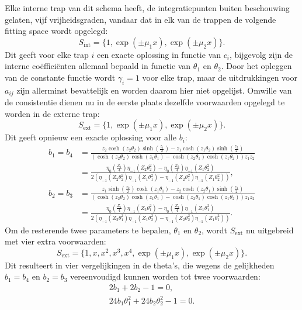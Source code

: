\documentclass[12pt]{article}
\begin{document}
Elke interne trap van dit schema heeft, de integratiepunten buiten beschouwing gelaten, vijf vrijheidsgraden, vandaar dat in elk van de trappen de volgende fitting space wordt opgelegd:
\[S_{\textrm{int}}=\{1,\exp(\pm\mu_1x),\exp(\pm\mu_2x)\}.\]
Dit geeft voor elke trap \(i\) een exacte oplossing in functie van \(c_i\), bijgevolg zijn de interne coëfficiënten allemaal bepaald in functie van \(\theta_1\) en \(\theta_2\). Door het opleggen van de constante functie wordt \(\gamma_i=1\) voor elke trap, maar de uitdrukkingen voor \(a_{ij}\) zijn allerminst bevattelijk en worden daarom hier niet opgelijst. Omwille van de consistentie dienen nu in de eerste plaats dezelfde voorwaarden opgelegd te worden in de externe trap:
\[S_{\textrm{ext}}=\{1,\exp(\pm\mu_1x),\exp(\pm\mu_2x)\}.\]
Dit geeft opnieuw een exacte oplossing voor alle \(b_i\):
\begin{equation*}
    \begin{split}
        b_1=b_4&=\frac{z_2\cosh(z_2\theta_2)\sinh(\frac{z_1}{2})-z_1\cosh(z_1\theta_2)\sinh(\frac{z_2}{2})}{(\cosh(z_2\theta_2)\cosh(z_1\theta_1)-\cosh(z_2\theta_1)\cosh(z_1\theta_2))z_1z_2} \\ &=\frac{\eta_0\left(\frac{Z_1}{4}\right)\eta_{-1}(Z_2\theta_2^2)-\eta_0\left(\frac{Z_2}{4}\right)\eta_{-1}(Z_1\theta_2^2)}{2(\eta_{-1}(Z_2\theta_2^2)\eta_{-1}(Z_1\theta_1^2)-\eta_{-1}(Z_2\theta_1^2)\eta_{-1}(Z_1\theta_2^2))},
    \end{split}
\end{equation*}
\begin{equation*}
    \begin{split}
        b_2=b_3&=\frac{z_1\sinh(\frac{z_2}{2})\cosh(z_1\theta_1)-z_2\cosh(z_2\theta_1)\sinh(\frac{z_1}{2})}{(\cosh(z_2\theta_2)\cosh(z_1\theta_1)-\cosh(z_2\theta_1)\cosh(z_1\theta_2))z_1z_2} \\ &=\frac{\eta_0\left(\frac{Z_1}{4}\right)\eta_{-1}(Z_2\theta_1^2)-\eta_0\left(\frac{Z_2}{4}\right)\eta_{-1}(Z_1\theta_1^2)}{2(\eta_{-1}(Z_2\theta_1^2)\eta_{-1}(Z_1\theta_2^2)-\eta_{-1}(Z_2\theta_2^2)\eta_{-1}(Z_1\theta_1^2))}.
    \end{split}
\end{equation*}
Om de resterende twee parameters te bepalen, \(\theta_1\) en \(\theta_2\), wordt \(S_{\textrm{ext}}\) nu uitgebreid met vier extra voorwaarden:
\[S_{\textrm{ext}}=\{1,x,x^2,x^3,x^4,\exp(\pm\mu_1x),\exp(\pm\mu_2x)\}.\]
Dit resulteert in vier vergelijkingen in de theta's, die wegens de gelijkheden \(b_1=b_4\) en \(b_2=b_3\) vereenvoudigd kunnen worden tot twee voorwaarden:
\begin{equation} \label{eq:thetarks4}
    \begin{gathered}
        2b_1+2b_2-1=0, \\
        24b_1\theta_1^2+24b_2\theta_2^2-1=0.
    \end{gathered}
\end{equation}
\end{document}
